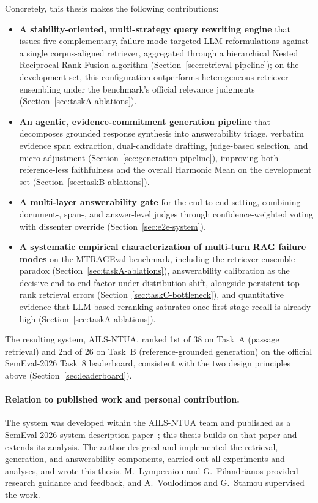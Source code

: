 Concretely, this thesis makes the following contributions:
\begin{itemize}
    \item \textbf{A stability-oriented, multi-strategy query rewriting engine} that issues five complementary, failure-mode-targeted LLM reformulations against a single corpus-aligned retriever, aggregated through a hierarchical Nested Reciprocal Rank Fusion algorithm (Section~\ref{sec:retrieval-pipeline}); on the development set, this configuration outperforms heterogeneous retriever ensembling under the benchmark's official relevance judgments (Section~\ref{sec:taskA-ablations}).
    \item \textbf{An agentic, evidence-commitment generation pipeline} that decomposes grounded response synthesis into answerability triage, verbatim evidence span extraction, dual-candidate drafting, judge-based selection, and micro-adjustment (Section~\ref{sec:generation-pipeline}), improving both reference-less faithfulness and the overall Harmonic Mean on the development set (Section~\ref{sec:taskB-ablations}).
    \item \textbf{A multi-layer answerability gate} for the end-to-end setting, combining document-, span-, and answer-level judges through confidence-weighted voting with dissenter override (Section~\ref{sec:e2e-system}).
    \item \textbf{A systematic empirical characterization of multi-turn RAG failure modes} on the MTRAGEval benchmark, including the retriever ensemble paradox (Section~\ref{sec:taskA-ablations}), answerability calibration as the decisive end-to-end factor under distribution shift, alongside persistent top-rank retrieval errors (Section~\ref{sec:taskC-bottleneck}), and quantitative evidence that LLM-based reranking saturates once first-stage recall is already high (Section~\ref{sec:taskA-ablations}).
\end{itemize}
The resulting system, AILS-NTUA, ranked 1st of 38 on Task~A (passage retrieval) and 2nd of 26 on Task~B (reference-grounded generation) on the official SemEval-2026 Task~8 leaderboard, consistent with the two design principles above (Section~\ref{sec:leaderboard}).

\paragraph{Relation to published work and personal contribution.}
The system was developed within the AILS-NTUA team and published as a SemEval-2026 system description paper~\citep{athanasiou2026ailsntua}; this thesis builds on that paper and extends its analysis. The author designed and implemented the retrieval, generation, and answerability components, carried out all experiments and analyses, and wrote this thesis. M.~Lymperaiou and G.~Filandrianos provided research guidance and feedback, and A.~Voulodimos and G.~Stamou supervised the work.

